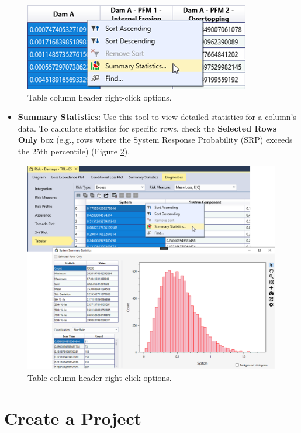 \documentclass[
]{book}
\providecommand{\tightlist}{%
  \setlength{\itemsep}{0pt}\setlength{\parskip}{0pt}}
\begin{document}
\begin{figure}

{\centering \includegraphics{images/figure46} 

}

\caption{Table column header right-click options.}\label{fig:figure-46}
\end{figure}

\begin{itemize}
\tightlist
\item
  \textbf{Summary Statistics}: Use this tool to view detailed statistics for a column's data. To calculate statistics for specific rows, check the \textbf{Selected Rows Only} box (e.g., rows where the System Response Probability (SRP) exceeds the 25th percentile) (Figure \ref{fig:figure-47}).
\end{itemize}

\begin{figure}

{\centering \includegraphics[width=0.85\linewidth]{images/figure47} 

}

\caption{Table column header right-click options.}\label{fig:figure-47}
\end{figure}

\hypertarget{create-a-project}{%
\chapter{Create a Project}\label{create-a-project}}
\end{document}
